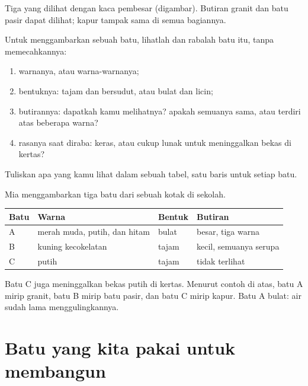 \begin{omfigure}
{\small Tiga  yang dilihat dengan kaca pembesar (digambar). Butiran
granit dan batu pasir dapat dilihat; kapur tampak sama di semua bagiannya.}
\label{fig:g3:stones-pebbles-sand:magnified}
\end{omfigure}

\begin{method}\label{met:g3:stones-pebbles-sand:look}
Untuk menggambarkan sebuah batu, lihatlah dan rabalah batu itu, tanpa
memecahkannya:
\begin{enumerate}
  \item warnanya, atau warna-warnanya;
  \item bentuknya: tajam dan bersudut, atau bulat dan licin;
  \item butirannya: dapatkah kamu melihatnya? apakah semuanya sama, atau
        terdiri atas beberapa warna?
  \item rasanya saat diraba: keras, atau cukup lunak untuk meninggalkan
        bekas di kertas?
\end{enumerate}
Tuliskan apa yang kamu lihat dalam sebuah tabel, satu baris untuk setiap batu.
\end{method}

\begin{example}\label{ex:g3:stones-pebbles-sand:table}
Mia menggambarkan tiga batu dari sebuah kotak di sekolah.
\begin{center}\small
\begin{tabular}{llll}
\hline
Batu & Warna & Bentuk & Butiran \\
\hline
A & merah muda, putih, dan hitam & bulat & besar, tiga warna \\
B & kuning kecokelatan & tajam & kecil, semuanya serupa \\
C & putih & tajam & tidak terlihat \\
\hline
\end{tabular}
\end{center}
Batu C juga meninggalkan bekas putih di kertas. Menurut contoh di atas,
batu A mirip granit, batu B mirip batu pasir, dan batu C mirip kapur.
Batu A bulat: air sudah lama menggulingkannya.
\end{example}

\section{Batu yang kita pakai untuk membangun}

